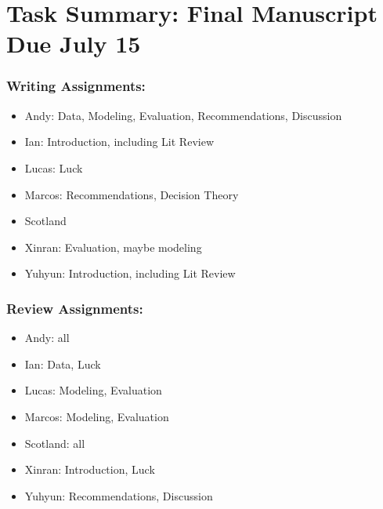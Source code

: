 \section*{Task Summary:  Final Manuscript Due July 15}

\subsubsection*{Writing Assignments:}
\begin{itemize}
\item Andy: Data, Modeling, Evaluation, Recommendations, Discussion
\item Ian: Introduction, including Lit Review
\item Lucas: Luck
\item Marcos: Recommendations, Decision Theory
\item Scotland 
\item Xinran: Evaluation, maybe modeling
\item Yuhyun: Introduction, including Lit Review
\end{itemize}

\subsubsection*{Review Assignments:}
\begin{itemize}
\item Andy: all
\item Ian: Data, Luck
\item Lucas: Modeling, Evaluation
\item Marcos: Modeling, Evaluation
\item Scotland: all
\item Xinran: Introduction, Luck
\item Yuhyun: Recommendations, Discussion
\end{itemize}

\newpage
